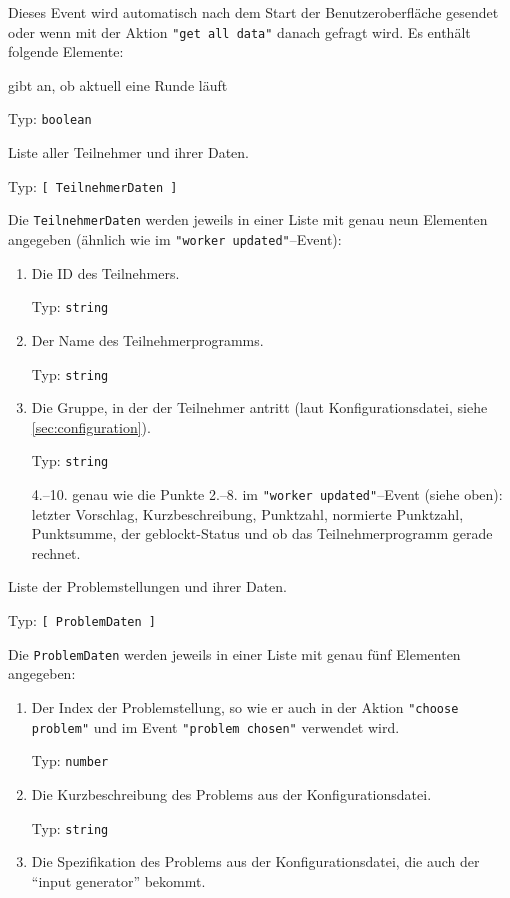 \documentclass[a4paper, 12pt]{article}
\newcommand{\type}[1]{{%
  \unskip\nobreak\hfil\penalty50%
  \hskip2pt\hbox{}\nobreak\hfil Typ: \texttt{#1}%
  \parfillskip=0pt \finalhyphendemerits=0 \par%
}}
\begin{document}
\begin{description}[\compact\breaklabel\setlabelstyle{\ttfamily}]
  \item[all data]
    Dieses Event wird automatisch nach dem Start der Benutzeroberfläche gesendet
    oder wenn mit der Aktion \verb+"get all data"+ danach gefragt wird.
    Es enthält folgende Elemente:
    \begin{description}[\compact\setlabelstyle{\ttfamily}]
      \item[running]
        gibt an, ob aktuell eine Runde läuft
        \type{boolean}
      \item[workers]
        Liste aller Teilnehmer und ihrer Daten.
        \type{[\,TeilnehmerDaten\,]}
        Die \verb+TeilnehmerDaten+ werden jeweils in einer Liste mit genau neun
        Elementen angegeben (ähnlich wie im \verb+"worker updated"+--Event):
        \begin{enumerate}
          \item Die ID des Teilnehmers.
                \type{string}
          \item Der Name des Teilnehmerprogramms.
                \type{string}
          \item Die Gruppe, in der der Teilnehmer antritt (laut
                Konfigurationsdatei, siehe \ref{sec:configuration}).
                \type{string}
          \item[4.--10.] genau wie die Punkte 2.--8. im
                \verb+"worker updated"+--Event (siehe oben):\\
                letzter Vorschlag, Kurzbeschreibung, Punktzahl, normierte
                Punktzahl, Punktsumme, der geblockt-Status und ob das
                Teilnehmerprogramm gerade rechnet.
        \end{enumerate}
      \item[problems]
        Liste der Problemstellungen und ihrer Daten.
        \type{[\,ProblemDaten\,]}
        Die \verb+ProblemDaten+ werden jeweils in einer Liste mit genau fünf
        Elementen angegeben:
        \begin{enumerate}
          \item Der Index der Problemstellung, so wie er auch in der Aktion
                \verb+"choose problem"+ und im Event \verb+"problem chosen"+
                verwendet wird.
                \type{number}
          \item Die Kurzbeschreibung des Problems aus der Konfigurationsdatei.
                \type{string}
          \item Die Spezifikation des Problems aus der Konfigurationsdatei,
                die auch der ``input generator'' bekommt.

\end{enumerate}
\end{description}
\end{description}
\end{document}
